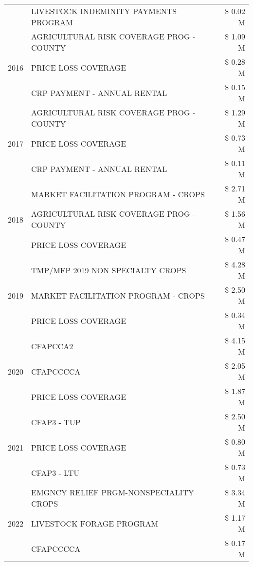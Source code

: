 \begin{tabular}{llr}
 & LIVESTOCK INDEMINITY PAYMENTS PROGRAM & \$ 0.02 M \\
\cline{1-3}
\multirow[t]{3}{*}{2016} & AGRICULTURAL RISK COVERAGE PROG - COUNTY & \$ 1.09 M \\
 & PRICE LOSS COVERAGE & \$ 0.28 M \\
 & CRP PAYMENT - ANNUAL RENTAL & \$ 0.15 M \\
\cline{1-3}
\multirow[t]{3}{*}{2017} & AGRICULTURAL RISK COVERAGE PROG - COUNTY & \$ 1.29 M \\
 & PRICE LOSS COVERAGE & \$ 0.73 M \\
 & CRP PAYMENT - ANNUAL RENTAL & \$ 0.11 M \\
\cline{1-3}
\multirow[t]{3}{*}{2018} & MARKET FACILITATION PROGRAM - CROPS & \$ 2.71 M \\
 & AGRICULTURAL RISK COVERAGE PROG - COUNTY & \$ 1.56 M \\
 & PRICE LOSS COVERAGE & \$ 0.47 M \\
\cline{1-3}
\multirow[t]{3}{*}{2019} & TMP/MFP 2019 NON SPECIALTY CROPS & \$ 4.28 M \\
 & MARKET FACILITATION PROGRAM - CROPS & \$ 2.50 M \\
 & PRICE LOSS COVERAGE & \$ 0.34 M \\
\cline{1-3}
\multirow[t]{3}{*}{2020} & CFAPCCA2 & \$ 4.15 M \\
 & CFAPCCCCA & \$ 2.05 M \\
 & PRICE LOSS COVERAGE & \$ 1.87 M \\
\cline{1-3}
\multirow[t]{3}{*}{2021} & CFAP3 - TUP & \$ 2.50 M \\
 & PRICE LOSS COVERAGE & \$ 0.80 M \\
 & CFAP3 - LTU & \$ 0.73 M \\
\cline{1-3}
\multirow[t]{3}{*}{2022} & EMGNCY RELIEF PRGM-NONSPECIALITY CROPS & \$ 3.34 M \\
 & LIVESTOCK FORAGE PROGRAM & \$ 1.17 M \\
 & CFAPCCCCA & \$ 0.17 M \\
\cline{1-3}
\bottomrule
\end{tabular}
